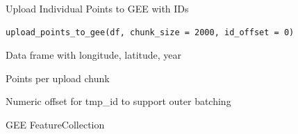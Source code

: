 \documentclass[letterpaper]{book}
\begin{document}
%
\begin{Description}
Upload Individual Points to GEE with IDs
\end{Description}
%
\begin{Usage}
\begin{verbatim}
upload_points_to_gee(df, chunk_size = 2000, id_offset = 0)
\end{verbatim}
\end{Usage}
%
\begin{Arguments}
\begin{ldescription}
\item[\code{df}] Data frame with longitude, latitude, year

\item[\code{chunk\_size}] Points per upload chunk

\item[\code{id\_offset}] Numeric offset for tmp\_id to support outer batching
\end{ldescription}
\end{Arguments}
%
\begin{Value}
GEE FeatureCollection
\end{Value}
\printindex{}
\end{document}
